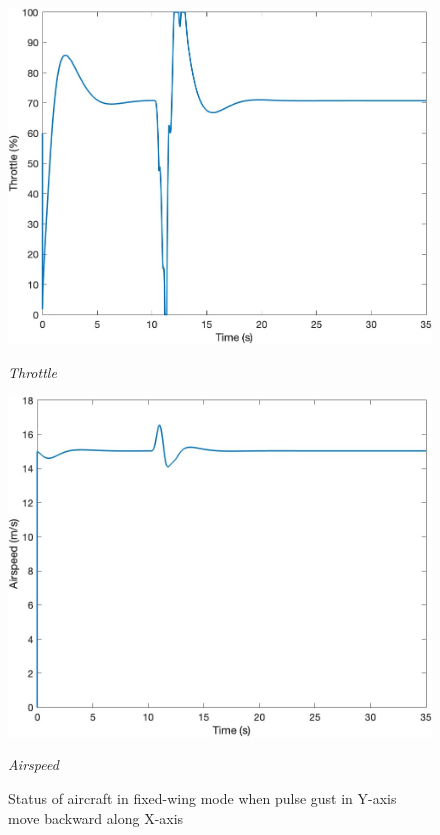 \begin{figure}[htbp]
\begin{minipage}[b]{0.45\textwidth}
    \centering
    \includegraphics[width=\textwidth]{Images/Gust/Gust FWD pulse 0428/5 Throttle_3.jpg}
    \caption*{\textit{Throttle}}
  \end{minipage}
  \hfil
  \begin{minipage}[b]{0.45\textwidth}
    \centering
    \includegraphics[width=\textwidth]{Images/Gust/Gust FWD pulse 0428/6 Airspeed_3.jpg}
    \caption*{\textit{Airspeed}}
  \end{minipage}
  \caption{Status of aircraft in fixed-wing mode when pulse gust in Y-axis move backward along X-axis}
  \label{fig:Gust FWD pulse y}
\end{figure}


